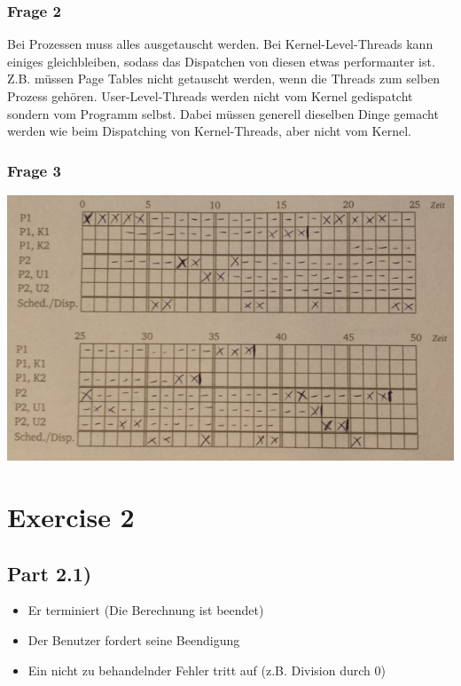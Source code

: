\documentclass[10pt,a4paper]{article}
\begin{document}
\subsubsection*{Frage 2}

Bei Prozessen muss alles ausgetauscht werden.
Bei Kernel-Level-Threads kann einiges gleichbleiben, sodass das Dispatchen von diesen etwas performanter ist.
Z.B. müssen Page Tables nicht getauscht werden, wenn die Threads zum selben Prozess gehören.
User-Level-Threads werden nicht vom Kernel gedispatcht sondern vom Programm selbst.
Dabei müssen generell dieselben Dinge gemacht werden wie beim Dispatching von Kernel-Threads, aber nicht vom Kernel.

\subsubsection*{Frage 3}

\includegraphics[width=\textwidth]{sheet-8/exercise-1-2-3}

\section*{Exercise 2}

\subsection*{Part 2.1)}

\begin{itemize}
\item Er terminiert (Die Berechnung ist beendet)
\item Der Benutzer fordert seine Beendigung
\item Ein nicht zu behandelnder Fehler tritt auf (z.B. Division durch 0)
\end{itemize}
\end{document}
